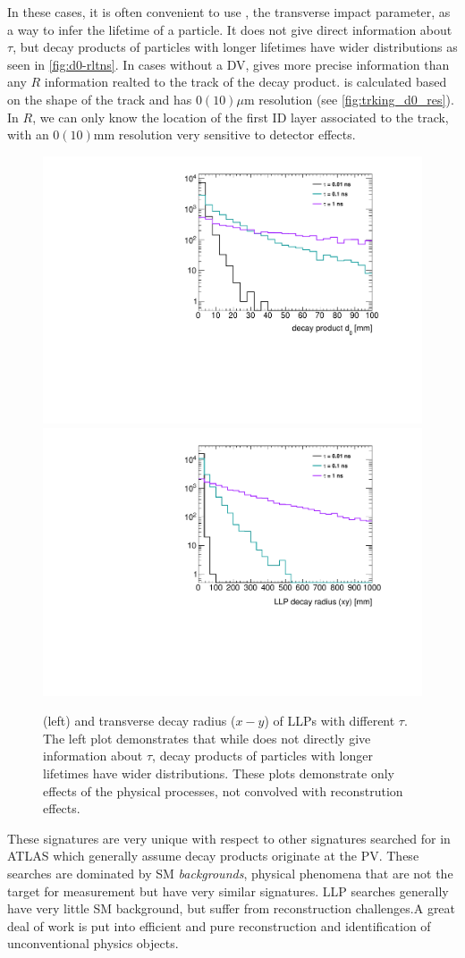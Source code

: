 In these cases, it is often convenient to use \dzero, the transverse impact parameter, as a way to infer the lifetime of a particle. It does not give direct information about $\tau$, but decay products of particles with longer lifetimes have wider \dzero distributions as seen in \autoref{fig:d0-rltns}. In cases without a \ac{DV}, \dzero gives more precise information than any $R$ information realted to the track of the decay product. \dzero is calculated based on the shape of the track and has $\mathcal{0}(10)\mu \textrm{m}$ resolution (see \autoref{fig:trking_d0_res}). In $R$, we can only know the location of the first \ac{ID} layer associated to the track, with an $\mathcal{0}(10)\textrm{mm}$ resolution very sensitive to detector effects.


\begin{figure}[htbp]
\centering
\includegraphics[width=.48\textwidth]{figures/theory/signal_d0.pdf}
\includegraphics[width=.48\textwidth]{figures/theory/signal_rxy.pdf}
\caption{\dzero (left) and transverse decay radius ($x-y$) of \ac{LLP}s with different $\tau$. The left plot demonstrates that while \dzero does not directly give information about $\tau$, decay products of particles with longer lifetimes have wider \dzero distributions. These plots demonstrate only effects of the physical processes, not convolved with reconstrution effects.}
\label{fig:d0-rltns}
\end{figure}


These signatures are very unique with respect to other signatures searched for in \ac{ATLAS} which generally assume decay products originate at the \ac{PV}. These searches are dominated by \ac{SM} \emph{backgrounds}, physical phenomena that are not the target for measurement but have very similar signatures. \ac{LLP} searches generally have very little \ac{SM} background, but suffer from reconstruction challenges.A great deal of work is put into efficient and pure reconstruction and identification of unconventional physics objects.

